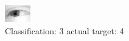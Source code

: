 \begin{figure}[h!]
\begin{center}
\includegraphics[width=0.60\columnwidth]{figures/ID2403_class_3_target_4.png}
\end{center}
\caption{ Classification: 3 actual target: 4}
\label{fig:ID2403_class_3_target_4}
\end{figure}
